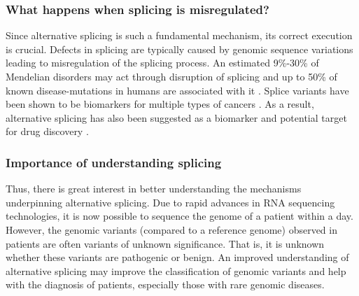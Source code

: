 \subsubsection{What happens when splicing is misregulated?}
Since alternative splicing is such a fundamental mechanism, its correct execution is crucial. Defects in splicing are typically caused by genomic sequence variations leading to misregulation of the splicing process. An estimated 9\%-30\% of Mendelian disorders may act through disruption of splicing \cite{comparison} and up to 50\% of known disease-mutations in humans are associated with it \cite{50diseasessplicing}. 
Splice variants have been shown to be biomarkers for multiple types of cancers \cite{cancer} \cite{splicingcausescancer}. As a result, alternative splicing has also been suggested as a biomarker and potential target for drug discovery \cite{drugdiscoverysplicing}. \\


\subsubsection{Importance of understanding splicing}
Thus, there is great interest in better understanding the mechanisms underpinning alternative splicing. Due to rapid advances in RNA sequencing technologies, it is now possible to sequence the genome of a patient within a day. However, the genomic variants (compared to a reference genome) observed in patients are often variants of unknown significance. \cite{bretschneiderphdthesis} That is, it is unknown whether these variants are pathogenic or benign. An improved understanding of alternative splicing may improve the classification of genomic variants and help with the diagnosis of patients, especially those with rare genomic diseases.
